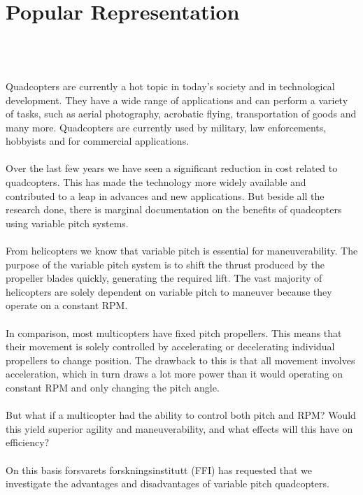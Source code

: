 \section{Popular Representation}\\\\\\
Quadcopters are currently a hot topic in today’s society and in technological development. They have a wide range of applications and can perform a variety of tasks, such as aerial photography, acrobatic flying, transportation of goods and many more. Quadcopters are currently used by military, law enforcements, hobbyists and for commercial applications. 
\\\\
Over the last few years we have seen a significant reduction in cost related to quadcopters. This has made the technology more widely available and contributed to a leap in 
advances and new applications. But beside all the research done, there is marginal documentation on the benefits of quadcopters using variable pitch systems.
\\\\
From helicopters we know that variable pitch is essential for maneuverability. The purpose of the variable pitch system is to shift the thrust produced by the propeller blades quickly, generating the required lift. The vast majority of helicopters are solely dependent on variable pitch to maneuver because they operate on a constant RPM.
\\\\
In comparison, most multicopters have fixed pitch propellers. This means that their movement is solely controlled by accelerating or decelerating individual propellers to change position. The drawback to this is that all movement involves acceleration, which in turn draws a lot more power than it would operating on constant RPM and only changing the pitch angle. 
\\\\
But what if a multicopter had the ability to control both pitch and RPM? Would this yield superior agility and maneuverability, and what effects will this have on efficiency? 
\\\\
On this basis forsvarets forskningsinstitutt (FFI) has requested that we investigate the advantages and disadvantages of variable pitch quadcopters. 


